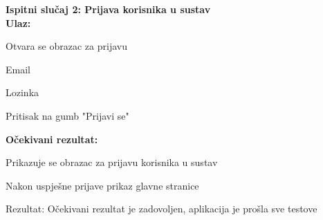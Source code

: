 		\noindent \textbf{Ispitni slučaj 2: Prijava korisnika u sustav}\\
			 \medskip
            \noindent\textbf{Ulaz:}
            \begin{packed_enum}
            \item Otvara se obrazac za prijavu
            \item Email
            \item Lozinka
            \item Pritisak na gumb "Prijavi se"
            \end{packed_enum}
            
            \noindent\textbf{Očekivani rezultat:}
            \begin{packed_enum}
            \item Prikazuje se obrazac za prijavu korisnika u sustav
            \item Nakon uspješne prijave prikaz glavne stranice
            \end{packed_enum}
            
            \noindent \text
            Rezultat: Očekivani rezultat je zadovoljen, aplikacija je prošla sve testove \\  
            
